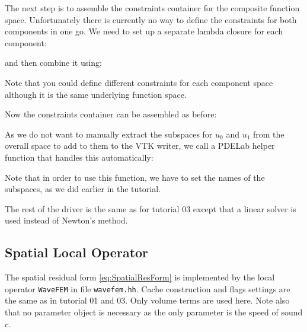 \documentclass[a4paper,12pt]{article}
\begin{document}
% 

The next step is to assemble the constraints container for the composite
function space. Unfortunately there is currently no way to define the
constraints for both components in one go. We need to
set up a separate lambda closure for each component:

and then combine it using:

Note that you could define different constraints for each component
space although it is the same underlying function space.

Now the constraints container can be assembled as before:


As we do not want to manually extract the subspaces for $u_0$ and $u_1$ from the
overall space to add to them to the VTK writer, we call a PDELab helper function that
handles this automatically:

Note that in order to use this function, we have to set the names of the subspaces,
as we did earlier in the tutorial.

The rest of the driver is the same as for tutorial 03 except that
a linear solver is used instead of Newton's method.

\subsection{Spatial Local Operator}

The spatial residual form \eqref{eq:SpatialResForm} is
implemented by the local operator \lstinline{WaveFEM} in
file \lstinline{wavefem.hh}. Cache construction and flags settings
are the same as in tutorial 01 and 03. Only volume terms are used here.
Note also that no parameter object is necessary as the only parameter
is the speed of sound $c$.
\end{document}
